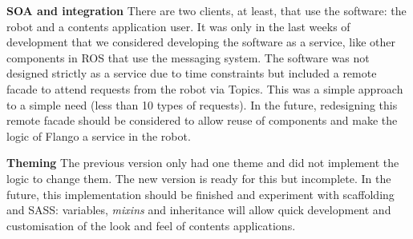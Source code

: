 \textbf{SOA and integration} There are two clients, at least, that use the software: the robot and a contents application user.
It was only in the last weeks of development that we considered developing the software as a service, like other components in \ac{ROS} that use the messaging system.
The software was not designed strictly as a service due to time constraints but included a remote facade to attend requests from the robot via Topics.
This was a simple approach to a simple need (less than 10 types of requests).
In the future, redesigning this remote facade should be considered to allow reuse of components and make the logic of Flango \cm a service in the robot.

\textbf{Theming} The previous version only had one theme and did not implement the logic to change them.
The new version is ready for this but incomplete.
In the future, this implementation should be finished and experiment with scaffolding and \ac{SASS}: variables, \textit{mixins} and inheritance will allow quick development and customisation of the look and feel of contents applications.
